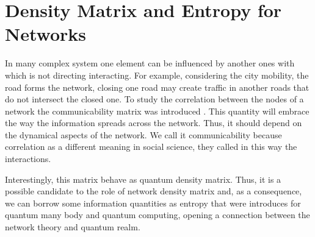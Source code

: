 \chapter{Density Matrix and Entropy for Networks}\label{C_Density_Matrix}

In many complex system one element can be influenced by another ones with which is not directing interacting. For example, considering the city mobility, the road forms the network, closing one road may create traffic in another roads that do not intersect the closed one. To study the correlation between the nodes of a network the communicability matrix was introduced \cite{Estrada_2008}. 
This quantity will embrace the way the information spreads across the network. Thus, it should depend on the dynamical aspects of the network.
We call it communicability because correlation as a different meaning in social science, they called in this way the interactions.

Interestingly, this matrix behave as quantum density matrix. Thus, it is a possible candidate to the role of network density matrix and, as a consequence, we can borrow some information quantities as entropy that were introduces for quantum many body and quantum computing, opening a connection between the network theory and quantum realm.




